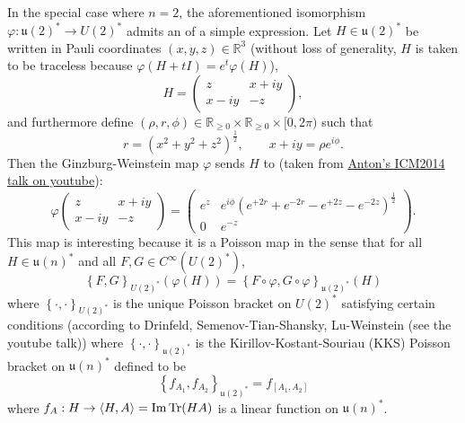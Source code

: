 \documentclass[notitlepage]{article}
\begin{document}
In the special case where $n = 2$, the aforementioned isomorphism $\varphi : \mathfrak u(2)^{*} \to U(2)^{*}$ admits an of a simple expression.
Let $H \in \mathfrak u(2)^{*}$ be written in Pauli coordinates $(x,y,z) \in \mathbb R^{3}$ (without loss of generality, $H$ is taken to be traceless because $\varphi(H+t I) = e^{t} \varphi(H)$),
\begin{equation}
    H = \begin{pmatrix}
        z & x + i y \\
        x - i y & - z
    \end{pmatrix},
\end{equation}
and furthermore define $(\rho, r, \phi) \in \mathbb R_{\geq 0} \times \mathbb R_{\geq 0} \times [0,2\pi)$ such that
\begin{equation}
    r = (x^2 + y^2 + z^2)^{\frac{1}{2}}, \qquad x + i y = \rho e^{i \phi}.
\end{equation}
Then the Ginzburg-Weinstein map $\varphi$ sends $H$ to (taken from \href{https://www.youtube.com/watch?v=U6MoHazD_YM}{Anton's ICM2014 talk on youtube}):
\begin{equation}
    \varphi
    \begin{pmatrix}
        z & x + i y \\
        x - i y & - z
    \end{pmatrix}
    =
    \begin{pmatrix}
        e^{z} & e^{i \phi} (e^{+2 r} + e^{-2 r} - e^{+2 z} - e^{-2 z})^{\frac{1}{2}} \\
        0 & e^{-z} 
    \end{pmatrix}.
\end{equation}
This map is interesting because it is a Poisson map in the sense that for all $H \in \mathfrak{u}(n)^{*}$ and all $F, G \in C^{\infty}(U(2)^{*})$,
\begin{equation}
    \left\{F, G \right\}_{U(2)^{*}}(\varphi(H)) = \left\{F\circ \varphi, G \circ \varphi\right\}_{\mathfrak{u}(2)^{*}}(H)
\end{equation}
where $\left\{\cdot, \cdot \right\}_{U(2)^{*}}$ is the unique Poisson bracket on $U(2)^{*}$ satisfying certain conditions (according to Drinfeld, Semenov-Tian-Shansky, Lu-Weinstein (see the youtube talk))
where $\left\{\cdot, \cdot \right\}_{\mathfrak{u}(2)^{*}}$ is the Kirillov-Kostant-Souriau (KKS) Poisson bracket on $\mathfrak{u}(n)^{*}$ defined to be
\begin{equation}
    \left\{ f_{A_1}, f_{A_2} \right\}_{\mathfrak{u}(2)^{*}} = f_{[A_1,A_2]}
\end{equation}
where $f_{A} : H \to \braket{H, A} = \mathrm{Im}\operatorname{Tr}(H A)$ is a linear function on $\mathfrak{u}(n)^{*}$.
\end{document}
